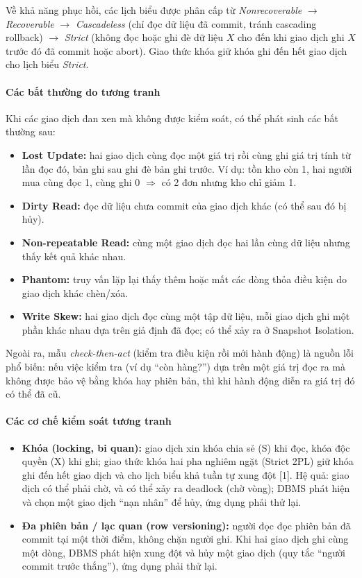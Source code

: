 Về khả năng phục hồi, các lịch biểu được phân cấp từ \textit{Nonrecoverable} $\rightarrow$ \textit{Recoverable} $\rightarrow$ \textit{Cascadeless} (chỉ đọc dữ liệu đã commit, tránh cascading rollback) $\rightarrow$ \textit{Strict} (không đọc hoặc ghi đè dữ liệu $X$ cho đến khi giao dịch ghi $X$ trước đó đã commit hoặc abort). Giao thức khóa giữ khóa ghi đến hết giao dịch cho lịch biểu \textit{Strict}.

\paragraph{Các bất thường do tương tranh}\mbox{}

Khi các giao dịch đan xen mà không được kiểm soát, có thể phát sinh các bất thường sau:
\begin{itemize}
    \item \textbf{Lost Update:} hai giao dịch cùng đọc một giá trị rồi cùng ghi giá trị tính từ lần đọc đó, bản ghi sau ghi đè bản ghi trước. Ví dụ: tồn kho còn 1, hai người mua cùng đọc 1, cùng ghi 0 $\Rightarrow$ có 2 đơn nhưng kho chỉ giảm 1.
    \item \textbf{Dirty Read:} đọc dữ liệu chưa commit của giao dịch khác (có thể sau đó bị hủy).
    \item \textbf{Non-repeatable Read:} cùng một giao dịch đọc hai lần cùng dữ liệu nhưng thấy kết quả khác nhau.
    \item \textbf{Phantom:} truy vấn lặp lại thấy thêm hoặc mất các dòng thỏa điều kiện do giao dịch khác chèn/xóa.
    \item \textbf{Write Skew:} hai giao dịch đọc cùng một tập dữ liệu, mỗi giao dịch ghi một phần khác nhau dựa trên giả định đã đọc; có thể xảy ra ở Snapshot Isolation.
\end{itemize}

Ngoài ra, mẫu \textit{check-then-act} (kiểm tra điều kiện rồi mới hành động) là nguồn lỗi phổ biến: nếu việc kiểm tra (ví dụ ``còn hàng?'') dựa trên một giá trị đọc ra mà không được bảo vệ bằng khóa hay phiên bản, thì khi hành động diễn ra giá trị đó có thể đã cũ.

\paragraph{Các cơ chế kiểm soát tương tranh}\mbox{}

\begin{itemize}
    \item \textbf{Khóa (locking, bi quan):} giao dịch xin khóa chia sẻ (S) khi đọc, khóa độc quyền (X) khi ghi; giao thức khóa hai pha nghiêm ngặt (Strict 2PL) giữ khóa ghi đến hết giao dịch và cho lịch biểu khả tuần tự xung đột [1]. Hệ quả: giao dịch có thể phải chờ, và có thể xảy ra deadlock (chờ vòng); DBMS phát hiện và chọn một giao dịch ``nạn nhân'' để hủy, ứng dụng phải thử lại.
    \item \textbf{Đa phiên bản / lạc quan (row versioning):} người đọc đọc phiên bản đã commit tại một thời điểm, không chặn người ghi. Khi hai giao dịch ghi cùng một dòng, DBMS phát hiện xung đột và hủy một giao dịch (quy tắc ``người commit trước thắng''), ứng dụng phải thử lại.
\end{itemize}


